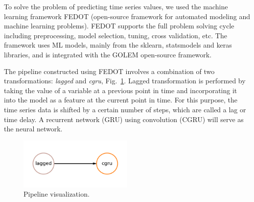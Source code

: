 \documentclass[runningheads]{llncs}
\begin{document}
To solve the problem of predicting time series values, we used the machine learning framework FEDOT \cite{FEDOT,nikitin2022automated} (open-source framework for automated modeling and machine learning problems). FEDOT supports the full problem solving cycle including preprocessing, model selection, tuning, cross validation, etc. The framework uses ML models, mainly from the sklearn, statsmodels and keras libraries, and is integrated with the GOLEM open-source framework.

The pipeline constructed using FEDOT involves a combination of two transformations: \textit{lagged} and \textit{cgru}, Fig.~\ref{fig2}. Lagged transformation is performed by taking the value of a variable at a previous point in time and incorporating it into the model as a feature at the current point in time. For this purpose, the time series data is shifted by a certain number of steps, which are called  a lag  or time delay. A recurrent network (GRU) using convolution (CGRU) will serve as the neural network.

%
%
%
%
%

\begin{figure}
\center
\includegraphics[width=0.5\textwidth]{fig2.png}
\caption{Pipeline visualization.} \label{fig2}
\end{figure}
\end{document}
